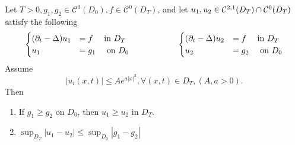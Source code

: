 \begin{PropBox}
    \begin{Cor}
        Let $T > 0, g_1, g_2 \in \mathcal{C}^0(D_0), f \in \mathcal{C}^0(D_T)$, and let $u_1,u_2 \in \mathcal{C}^{2,1}(D_T) \cap \mathcal{C}^0(\Bar{D}_T)$ satisfy the following 
        \begin{equation*}
            \begin{cases}
                (\partial_t - \Delta) u_1 &= f \quad \text{ in } D_T\\
                u_1\ &= g_1 \quad \text{ on } D_0
            \end{cases}
            \hspace{2 cm}
            \begin{cases}
                (\partial_t - \Delta) u_2 &= f \quad \text{ in } D_T\\
                u_2\ &= g_2 \quad \text{ on } D_0
            \end{cases}
        \end{equation*}
        Assume 
        \begin{equation*}
            |u_i(x,t)| \leq A e^{a |x|^2}, \forall (x,t) \in D_T, (A,a > 0).
        \end{equation*}
        Then
        \begin{enumerate}
            \item If $g_1 \geq g_2$ on $D_0$, then $u_1 \geq u_2$ in $D_T$.
            \item $\sup_{D_T} |u_1 - u_2| \leq \sup_{D_0} |g_1-g_2|$
        \end{enumerate}
    \end{Cor}
\end{PropBox}
